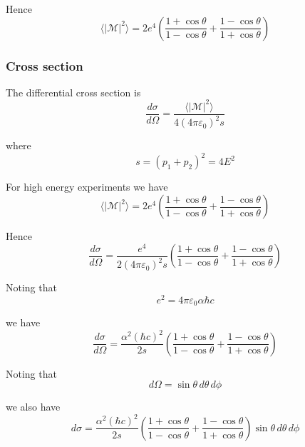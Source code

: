 Hence
\begin{equation*}
\langle|\mathcal{M}|^2\rangle
=2e^4\left(
\frac{1+\cos\theta}{1-\cos\theta}+
\frac{1-\cos\theta}{1+\cos\theta}
\right)
\end{equation*}

\subsubsection*{Cross section}

The differential cross section is
\begin{equation*}
\frac{d\sigma}{d\Omega}=\frac{\langle|\mathcal{M}|^2\rangle}{4(4\pi\varepsilon_0)^2s}
\end{equation*}

where
\begin{equation*}
s=(p_1+p_2)^2=4E^2
\end{equation*}

For high energy experiments we have
\begin{equation*}
\langle|\mathcal{M}|^2\rangle=2e^4\left(
\frac{1+\cos\theta}{1-\cos\theta}+
\frac{1-\cos\theta}{1+\cos\theta}
\right)
\end{equation*}

Hence
\begin{equation*}
\frac{d\sigma}{d\Omega}
=\frac{e^4}{2(4\pi\varepsilon_0)^2s}\left(\frac{1+\cos\theta}{1-\cos\theta}+\frac{1-\cos\theta}{1+\cos\theta}\right)
\end{equation*}

Noting that
\begin{equation*}
e^2=4\pi\varepsilon_0\alpha\hbar c
\end{equation*}

we have
\begin{equation*}
\frac{d\sigma}{d\Omega}
=
\frac{\alpha^2(\hbar c)^2}{2s}
\left(
\frac{1+\cos\theta}{1-\cos\theta}+
\frac{1-\cos\theta}{1+\cos\theta}
\right)
\end{equation*}

Noting that
\begin{equation*}
d\Omega=\sin\theta\,d\theta\,d\phi
\end{equation*}

we also have
\begin{equation*}
d\sigma=
\frac{\alpha^2(\hbar c)^2}{2s}
\left(
\frac{1+\cos\theta}{1-\cos\theta}+
\frac{1-\cos\theta}{1+\cos\theta}
\right)\sin\theta\,d\theta\,d\phi
\end{equation*}

